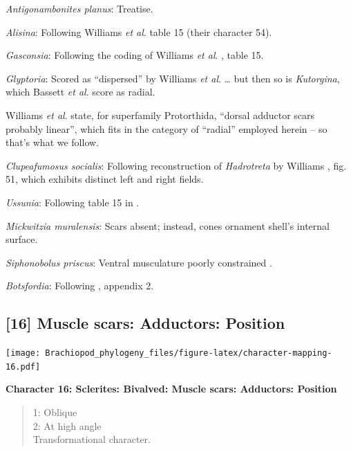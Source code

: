 \documentclass[]{book}
\theoremstyle{definition}
\theoremstyle{definition}
\theoremstyle{definition}
\theoremstyle{remark}
\begin{document}
\emph{Antigonambonites planus}: Treatise.

\emph{Alisina}: Following Williams \emph{et al}.
\citeyearpar{Williams2000BrachiopodaLinguliformea} table 15 (their
character 54).

\emph{Gasconsia}: Following the coding of Williams \emph{et al}.
\citeyearpar{Williams2000BrachiopodaLinguliformea}, table 15.

\emph{Glyptoria}: Scored as ``dispersed'' by Williams \emph{et al}.
\citeyearpar{Williams1998Thediversity} \ldots{} but then so is
\emph{Kutorgina}, which Bassett \emph{et al}.
\citeyearpar{Bassett2001Functionalmorphology} score as radial.

Williams \emph{et al}.
\citeyearpar{Williams2000BrachiopodaLinguliformea} state, for
superfamily Protorthida, ``dorsal adductor scars probably linear'',
which fits in the category of ``radial'' employed herein -- so that's
what we follow.

\emph{Clupeafumosus socialis}: Following reconstruction of
\emph{Hadrotreta} by Williams
\citeyearpar{Williams2000BrachiopodaLinguliformea}, fig. 51, which
exhibits distinct left and right fields.

\emph{Ussunia}: Following table 15 in
\citet{Williams2000BrachiopodaLinguliformea}.

\emph{Mickwitzia muralensis}: Scars absent; instead, cones ornament
shell's internal surface.

\emph{Siphonobolus priscus}: Ventral musculature poorly constrained
\citep{Williams2000BrachiopodaLinguliformea, Popov2009Earlyontogeny}.

\emph{Botsfordia}: Following \citet{Williams1998Thediversity}, appendix
2.

\hypertarget{muscle-scars-adductors-position}{%
\subsection*{{[}16{]} Muscle scars: Adductors:
Position}\label{muscle-scars-adductors-position}}

\texttt{[image: Brachiopod\_phylogeny\_files/figure-latex/character-mapping-16.pdf]}

\textbf{Character 16: Sclerites: Bivalved: Muscle scars: Adductors:
Position}

\begin{quote}
1: Oblique\\
2: At high angle\\
Transformational character.
\end{quote}
\end{document}
